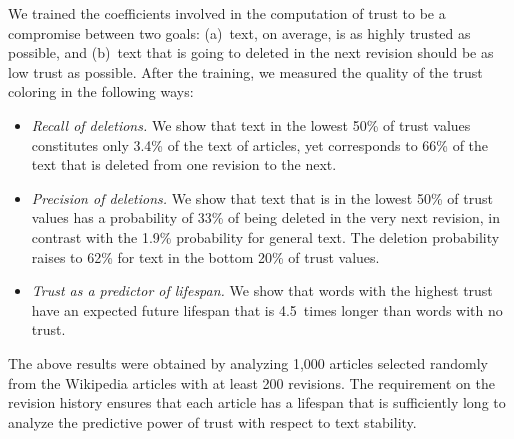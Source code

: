 We trained the coefficients involved in the computation of trust to be a
compromise between two goals: (a)~text, on average, is as
highly trusted as possible, and (b)~text that is going to deleted in
the next revision should be as low trust as possible.
After the training, we measured the quality of the trust coloring in
the following ways:
%
\begin{itemize}

\item {\em Recall of deletions.}
  We show that text in the lowest 50\% of trust values constitutes
  only 3.4\% of the text of articles, yet corresponds to 66\% of the
  text that is deleted from one revision to the next.

\item {\em Precision of deletions.}
  We show that text that is in the lowest 50\% of trust values has a
  probability of 33\% of being deleted in the very next revision, in
  contrast with the 1.9\% probability for general text.
  The deletion probability raises to 62\% for text in the bottom 20\%
  of trust values.


\item {\em Trust as a predictor of lifespan.}
  We show that words with the highest trust have an expected future
  lifespan that is 4.5~times longer than words with no trust.

\end{itemize}
%
%
The above results were obtained by analyzing 1,000 articles selected
randomly from the Wikipedia articles with at least 200 revisions.
The requirement on the revision history ensures that each article has
a lifespan that is sufficiently long to analyze the predictive power
of trust with respect to text stability.


